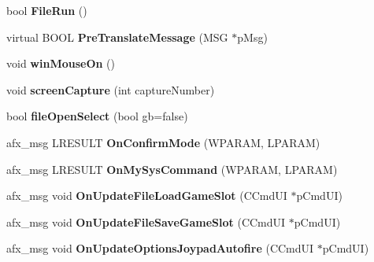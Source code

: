 \begin{DoxyCompactItemize}
\item 
\mbox{\label{class_main_wnd_a946cd4793215a424eb736af418ccbc3d}} 
bool {\bfseries File\+Run} ()
\item 
\mbox{\label{class_main_wnd_a540792c5b97a767144d2bd821c46bfb3}} 
virtual B\+O\+OL {\bfseries Pre\+Translate\+Message} (M\+SG $\ast$p\+Msg)
\item 
\mbox{\label{class_main_wnd_aadc325bab367045adb1258609f8f2c9e}} 
void {\bfseries win\+Mouse\+On} ()
\item 
\mbox{\label{class_main_wnd_aea243ed57e88a9efec1196d510d6b235}} 
void {\bfseries screen\+Capture} (int capture\+Number)
\item 
\mbox{\label{class_main_wnd_a872b497a88ca77012694cc909c62e6e4}} 
bool {\bfseries file\+Open\+Select} (bool gb=false)
\item 
\mbox{\label{class_main_wnd_a6e5d37a503b080743b30005e2d51e28d}} 
afx\+\_\+msg L\+R\+E\+S\+U\+LT {\bfseries On\+Confirm\+Mode} (W\+P\+A\+R\+AM, L\+P\+A\+R\+AM)
\item 
\mbox{\label{class_main_wnd_a314268b72fbd07b1e4fe0b96dada585e}} 
afx\+\_\+msg L\+R\+E\+S\+U\+LT {\bfseries On\+My\+Sys\+Command} (W\+P\+A\+R\+AM, L\+P\+A\+R\+AM)
\item 
\mbox{\label{class_main_wnd_a3b43dc9ab5ebe806a89d50eca3820369}} 
afx\+\_\+msg void {\bfseries On\+Update\+File\+Load\+Game\+Slot} (C\+Cmd\+UI $\ast$p\+Cmd\+UI)
\item 
\mbox{\label{class_main_wnd_a55a4bc3c3b2b956aa3a58af9a0656a79}} 
afx\+\_\+msg void {\bfseries On\+Update\+File\+Save\+Game\+Slot} (C\+Cmd\+UI $\ast$p\+Cmd\+UI)
\item 
\mbox{\label{class_main_wnd_a3cb911708a00979763e000bed2023791}} 
afx\+\_\+msg void {\bfseries On\+Update\+Options\+Joypad\+Autofire} (C\+Cmd\+UI $\ast$p\+Cmd\+UI)
\item 
\mbox{\label{class_main_wnd_a2b3ef3e8d807f8399870b6a898fbd4e3}} 

\end{DoxyCompactItemize}
